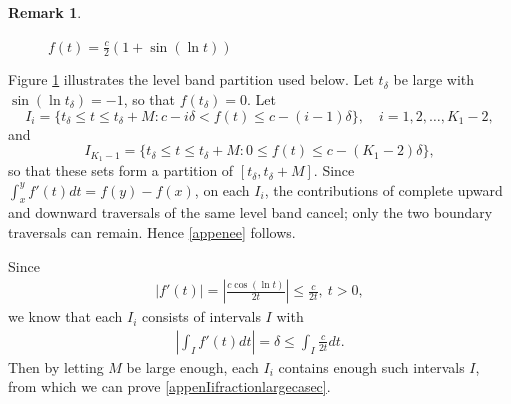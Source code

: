 \documentclass[12pt]{amsart}
\newcommand{\abs}[1]{\left\lvert #1 \right\rvert}
\theoremstyle{plain}
\theoremstyle{definition}
\newtheorem{remark}[theorem]{Remark}
\begin{document}
\begin{remark}
\begin{figure}[H]
		\caption{$f(t)=\frac{c}{2}(1+\sin (\ln t))$}
		\label{figcontinuousbands}
	\end{figure}
Figure \ref{figcontinuousbands} illustrates the level band partition used below.
	Let $t_\delta$ be large with $\sin(\ln t_{\delta})=-1$, so that $f(t_\delta)=0$. Let
	\[
	I_i=\{t_{\delta}\leq t\leq t_{\delta}+M:c-i\delta<f(t)\leq c-(i-1)\delta\},
	\quad i=1,2,\ldots,K_1-2,
	\]
	and
	\[
	I_{K_1-1}=\{t_{\delta}\leq t\leq t_{\delta}+M:0\leq f(t)\leq c-(K_1-2)\delta\},
	\]
	so that these sets form a partition of $[t_\delta,t_\delta+M]$. Since $\int_{x}^{y}f'(t)dt=f(y)-f(x)$, on each $I_i$, the contributions of complete upward and downward traversals of the same level band cancel; only the two boundary traversals can remain. Hence \eqref{appenee} follows.
	
	Since 
	\begin{align}
		\abs{f'(t)}=\abs{\frac{c\cos(\ln t)}{2t}}\leq \frac{c}{2t},\ t>0,\nonumber
	\end{align}
	we know that each $I_i$ consists of intervals $I$ with
	\begin{align}
		\abs{\int_I f'(t)dt}=\delta\leq \int_I\frac{c}{2t}dt.\nonumber
	\end{align}
	Then  by letting $M$ be large enough, each $I_i$ contains enough such intervals $I$, from which we can prove \eqref{appenIifractionlargecasec}.
\end{remark}
\end{document}
